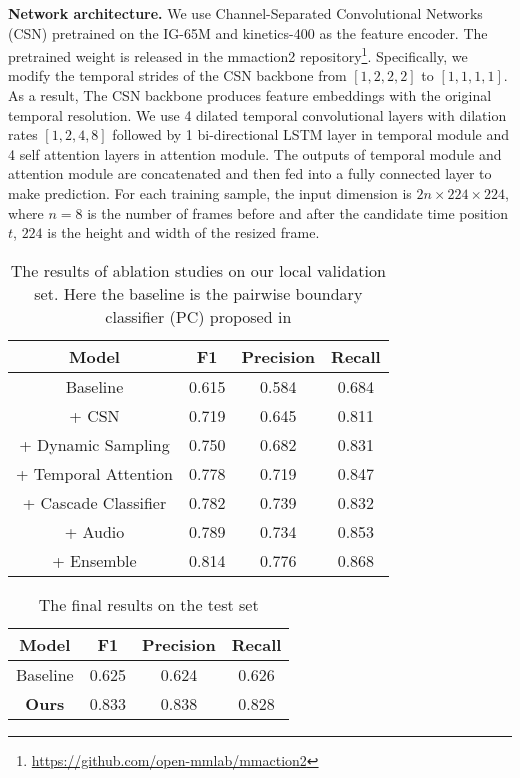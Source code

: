 \documentclass[final]{cvpr}
\begin{document}
\textbf{Network architecture.} We use Channel-Separated Convolutional Networks (CSN) \cite{CSN} pretrained on the IG-65M \cite{IG} and kinetics-400 as the feature encoder. The pretrained weight is released in the mmaction2 repository\footnote{\url{https://github.com/open-mmlab/mmaction2}}. Specifically, we modify the temporal strides of the CSN backbone from $[1, 2, 2, 2]$ to $[1, 1, 1, 1]$. As a result, The CSN backbone produces feature embeddings with the original temporal resolution. We use 4 dilated temporal convolutional layers with dilation rates $[1, 2, 4, 8]$ followed by 1 bi-directional LSTM layer in temporal module and 4 self attention layers \cite{DBLP:conf/nips/attention} in attention module. The outputs of temporal module and attention module are concatenated and then fed into a fully connected layer to make prediction. For each training sample, the input dimension is $2n\times 224 \times 224$, where $n=8$ is the number of frames before and after the candidate time position $t$, $224$ is the height and width of the resized frame. 


\begin{table}[!t]
    \centering
    \begin{tabular}{c c c c}
    \toprule[1.2pt]
        Model & F1 & Precision & Recall \\
    \hline
        Baseline\cite{DBLP:journals/corr/GEBD_dataset} & 0.615 & 0.584 & 0.684 \\
        + CSN \cite{CSN} & 0.719 & 0.645 & 0.811 \\
        + Dynamic Sampling & 0.750 & 0.682 & 0.831 \\
        + Temporal Attention & 0.778 & 0.719 & 0.847 \\
        + Cascade Classifier & 0.782 & 0.739 & 0.832 \\
        + Audio & 0.789 & 0.734 & 0.853 \\
        + Ensemble & 0.814 & 0.776 & 0.868 \\
    \bottomrule[1.2pt]
    \end{tabular}
    \caption{The results of ablation studies on our local validation set. Here the baseline is the pairwise boundary classifier (PC) proposed in \cite{DBLP:journals/corr/GEBD_dataset}}
    \label{tab:ablation}
\end{table}


\begin{table}[!t]
    \centering
    \begin{tabular}{c c c c}
    \toprule[1.2pt]
        Model & F1 & Precision & Recall \\
    \hline
        Baseline\cite{DBLP:journals/corr/GEBD_dataset} & 0.625 & 0.624 & 0.626 \\
        \textbf{Ours} & 0.833 & 0.838 & 0.828 \\
    \bottomrule[1.2pt]
    \end{tabular}
    \caption{The final results on the test set}
    \label{tab:final}
\end{table}
\end{document}
